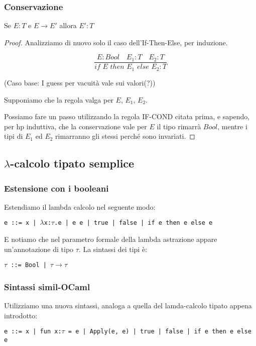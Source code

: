 \documentclass[a4paper,10pt]{article}
\begin{document}
    \subsubsection{Conservazione}
    Se $E:T$ e  $E \to E'$ allora $E':T$
    \begin{proof}
     Analizziamo di nuovo solo il caso dell'If-Then-Else, per induzione.
     
      \[\dfrac{E : Bool\quad E_1 : T\quad E_2:T}{if\,\, E\,\, then\,\, E_1\,\, else\,\, E_2 : T}\]
     
     (Caso base: I guess per vacuità vale sui valori(?))\medskip
     
     Supponiamo che la regola valga per $E$, $E_1$, $E_2$.
     
     Possiamo fare un passo utilizzando la regola IF-COND citata prima, e sapendo, per hp induttiva, che la conservazione vale per $E$ il tipo rimarrà $Bool$, mentre i tipi di $E_1$ ed $E_2$ rimarranno gli stessi perché sono invariati.
    \end{proof}
\newpage
     \subsection{$\lambda$-calcolo tipato semplice}
     \subsubsection{Estensione con i booleani}
     Estendiamo il lambda calcolo nel seguente modo:
     \begin{center}
        \tt e ::= x | $\lambda$x:$\tau$.e | e e | true | false | if e then e else e
     \end{center}
     E notiamo che nel parametro formale della lambda astrazione appare un'annotazione di tipo $\tau$. La sintassi dei tipi è:
     
     \begin{center}
      \tt $\tau$ ::= Bool | $\tau\to \tau$
     \end{center}

     \subsubsection{Sintassi simil-OCaml}
     Utilizziamo una nuova sintassi, analoga a quella del lamda-calcolo tipato appena introdotto:
     \begin{center}
        \tt e ::= x | fun x:$\tau$ = e | Apply(e, e) | true | false | if e then e else e
     \end{center}
     
\end{document}
